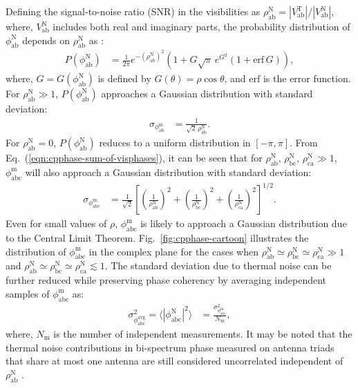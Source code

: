 \documentclass[
reprint,
superscriptaddress,
amsmath,
amssymb,
aps,
]{revtex4-1}
\begin{document}
Defining the signal-to-noise ratio (SNR) in the visibilities as $\rho_\textrm{ab}^\textrm{N} = |V_\textrm{ab}^\textrm{T}|/|V_\textrm{ab}^\textrm{N}|$, where, $V_\textrm{ab}^\textrm{N}$ includes both real and imaginary parts, the probability distribution of $\phi_\textrm{ab}^\textrm{N}$ depends on $\rho_\textrm{ab}^\textrm{N}$ as \cite{cra89}:
\begin{align}
  P(\phi_\textrm{ab}^\textrm{N}) &= \frac{1}{2\pi} e^{-(\rho_\textrm{ab}^\textrm{N})^2} \left(1 + G\sqrt{\pi}\,e^{G^2}(1+\mathrm{erf}\,G)\right),
\end{align}
where, $G=G(\phi_\textrm{ab}^\textrm{N})$ is defined by $G(\theta)=\rho\cos\theta$, and $\mathrm{erf}$ is the error function. For $\rho_\textrm{ab}^\textrm{N}\gg 1$, $P(\phi_\textrm{ab}^\textrm{N})$ approaches a Gaussian distribution with standard deviation:
\begin{align}
  \sigma_{\phi_\textrm{ab}^\textrm{m}} &= \frac{1}{\sqrt{2}\,\rho_\textrm{ab}^\textrm{N}}.
\end{align}
For $\rho_\textrm{ab}^\textrm{N}=0$, $P(\phi_\textrm{ab}^\textrm{N})$ reduces to a uniform distribution in $[-\pi,\pi]$. From Eq.~(\ref{eqn:cpphase-sum-of-visphases}), it can be seen that for $\rho_\textrm{ab}^\textrm{N},\,\rho_\textrm{bc}^\textrm{N},\,\rho_\textrm{ca}^\textrm{N}\gg 1$, $\phi_\textrm{abc}^\textrm{m}$ will also approach a Gaussian distribution with standard deviation:
\begin{align}
  \sigma_{\phi_\textrm{abc}^\textrm{m}} &= \frac{1}{\sqrt{2}}\left[\left(\frac{1}{\rho_\textrm{ab}^\textrm{N}}\right)^2 + \left(\frac{1}{\rho_\textrm{bc}^\textrm{N}}\right)^2 + \left(\frac{1}{\rho_\textrm{ca}^\textrm{N}}\right)^2\right]^{1/2}. \label{eqn:cprms-noise}
\end{align}
Even for small values of $\rho$, $\phi_\textrm{abc}^\textrm{m}$ is likely to approach a Gaussian distribution due to the Central Limit Theorem. Fig.~\ref{fig:cpphase-cartoon} illustrates the distribution of $\phi_\textrm{abc}^\textrm{m}$ in the complex plane for the cases when $\rho_\textrm{ab}^\textrm{N}\simeq\rho_\textrm{bc}^\textrm{N}\simeq\rho_\textrm{ca}^\textrm{N} \gg 1$ and $\rho_\textrm{ab}^\textrm{N}\simeq\rho_\textrm{bc}^\textrm{N}\simeq\rho_\textrm{ca}^\textrm{N} \lesssim 1$. The standard deviation due to thermal noise can be further reduced while preserving phase coherency by averaging independent samples of $\phi_\textrm{abc}^\textrm{m}$ as:
\begin{align}
  \sigma_{\phi_\textrm{abc}^\textrm{avg}}^2 = \bigg\langle |\phi_\textrm{abc}^\textrm{N}|^2\bigg\rangle &= \frac{\sigma_{\phi_\textrm{abc}^\textrm{m}}^2}{N_\textrm{m}},
\end{align}
where, $N_\textrm{m}$ is the number of independent measurements. It may be noted that the thermal noise contributions in bi-spectrum phase measured on antenna triads that share at most one antenna are still considered uncorrelated independent of $\rho_\textrm{ab}^\textrm{N}$ \cite{kul89}.
\end{document}
